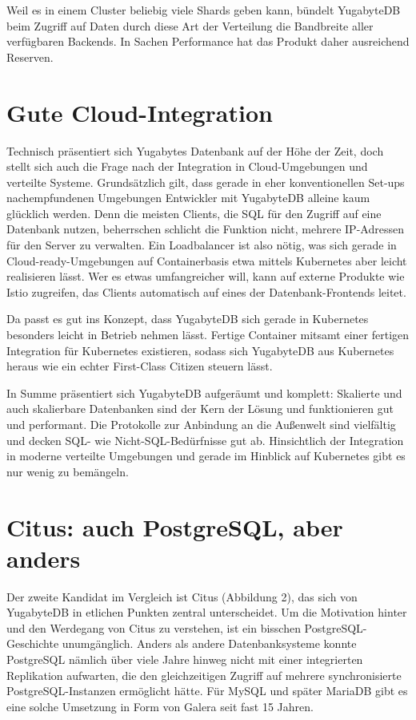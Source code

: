 Weil es in einem Cluster beliebig viele Shards geben kann, bündelt YugabyteDB beim Zugriff auf Daten durch diese Art der Verteilung die Bandbreite aller verfügbaren Backends. In Sachen Performance hat das Produkt daher ausreichend Reserven.

\section{Gute Cloud-Integration}

Technisch präsentiert sich Yugabytes Datenbank auf der Höhe der Zeit, doch stellt sich auch die Frage nach der Integration in Cloud-Umgebungen und verteilte Systeme. Grundsätzlich gilt, dass gerade in eher konventionellen Set-ups nachempfundenen Umgebungen Entwickler mit YugabyteDB alleine kaum glücklich werden. Denn die meisten Clients, die SQL für den Zugriff auf eine Datenbank nutzen, beherrschen schlicht die Funktion nicht, mehrere IP-Adressen für den Server zu verwalten. Ein Loadbalancer ist also nötig, was sich gerade in Cloud-ready-Umgebungen auf Containerbasis etwa mittels Kubernetes aber leicht realisieren lässt. Wer es etwas umfangreicher will, kann auf externe Produkte wie Istio zugreifen, das Clients automatisch auf eines der Datenbank-Frontends leitet.

Da passt es gut ins Konzept, dass YugabyteDB sich gerade in Kubernetes besonders leicht in Betrieb nehmen lässt. Fertige Container mitsamt einer fertigen Integration für Kubernetes existieren, sodass sich YugabyteDB aus Kubernetes heraus wie ein echter First-Class Citizen steuern lässt.

In Summe präsentiert sich YugabyteDB aufgeräumt und komplett: Skalierte und auch skalierbare Datenbanken sind der Kern der Lösung und funktionieren gut und performant. Die Protokolle zur Anbindung an die Außenwelt sind vielfältig und decken SQL- wie Nicht-SQL-Bedürfnisse gut ab. Hinsichtlich der Integration in moderne verteilte Umgebungen und gerade im Hinblick auf Kubernetes gibt es nur wenig zu bemängeln.

\section{Citus: auch PostgreSQL, aber anders}

Der zweite Kandidat im Vergleich ist Citus (Abbildung 2), das sich von YugabyteDB in etlichen Punkten zentral unterscheidet. Um die Motivation hinter und den Werdegang von Citus zu verstehen, ist ein bisschen PostgreSQL-Geschichte unumgänglich. Anders als andere Datenbanksysteme konnte PostgreSQL nämlich über viele Jahre hinweg nicht mit einer integrierten Replikation aufwarten, die den gleichzeitigen Zugriff auf mehrere synchronisierte PostgreSQL-Instanzen ermöglicht hätte. Für MySQL und später MariaDB gibt es eine solche Umsetzung in Form von Galera seit fast 15 Jahren.

